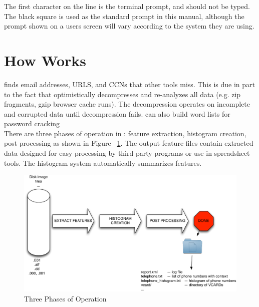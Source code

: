 \documentclass[11pt]{article} %
\begin{document}
The first character on the line is the terminal prompt, and should not be typed. The black square is used as the standard prompt in this manual, although the prompt shown on a users screen will vary according to the system they are using.\\


\section{How \bulk Works}
\bulk finds email addresses, URLS,  and CCNs that other tools miss. This is due in part to the fact that \bulk optimistically decompresses and re-analyzes all data (e.g. zip fragments, gzip browser cache runs). The decompression operates on incomplete and corrupted data until decompression fails. \bulk can also build word lists for password cracking\\

There are three phases of operation in \bulk:  feature extraction, histogram creation, post processing as shown in Figure ~\ref{fig:overviewPic}. The output feature files contain extracted data designed for easy processing by third party programs or use in spreadsheet tools. The \bulk histogram system automatically summarizes features.\\

\begin{figure}
	\center
	\includegraphics[scale=.60]{archPics/howitworks.pdf}
	\caption{Three Phases of \bulk Operation}
	\label{fig:overviewPic}
\end{figure}
\end{document}
